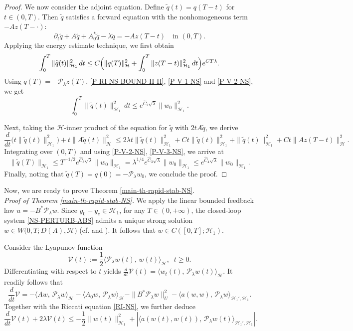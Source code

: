 \documentclass[a4paper]{article}
\numberwithin{equation}{section}
\begin{document}
\begin{proof}
We now consider the adjoint equation. Define $\widetilde q(t)=q(T-t)$ for $t\in(0,T)$. Then $\widetilde q$ satisfies a forward equation with the nonhomogeneous term $-A z(T-\cdot)$:
\[
\partial_t\widetilde q+A\widetilde q+A_0^*\widetilde q-
\lambda\widetilde q=-Az(T-t)\quad \text{in } (0,T).
\]
Applying the energy estimate technique, we first obtain
$$\int_0^T \|\widetilde q(t)\|_{\mathcal H_1}^2\,dt\le C \Bigl(\|q(T)\|_{\mathcal H}^2+ \int_0^T \|  z(T-t)\|_{\mathcal H_1}^2\,dt\Bigr)e^{CT\lambda}.$$
Using $q(T)=-\mathcal{P}_\lambda z(T)$, \eqref{P-RI-NS-BOUND-H-H}, \eqref{P-V-1-NS} and \eqref{P-V-2-NS}, we get 
\begin{equation}\label{P-V-3-NS}
\int_0^T \|\widetilde q(t)\|_{\mathcal H_1}^2\,dt\le e^{\hat C_2\sqrt{\lambda}}\|w_0\|_{\mathcal H_1}^2.
\end{equation}

Next, taking the $\mathcal H$-inner product of the equation for $\widetilde q$ with $2tA\widetilde q$, we derive
$$\frac{d}{dt}\bigl(t\|\widetilde q(t)\|_{\mathcal H_1}^2\bigr)+t\| A\widetilde q(t)\|_{\mathcal H}^2\le2\lambda t\|\widetilde q(t)\|_{\mathcal H_1}^2+Ct\|\widetilde q(t)\|_{\mathcal H_1}^2		+\|\widetilde q(t)\|_{\mathcal H_1}^2+Ct\|  A z(T-t)\|_{\mathcal H}^2.$$
Integrating over $(0,T)$ and using \eqref{P-V-2-NS}, \eqref{P-V-3-NS}, we arrive at
\begin{equation}\label{P-V-4-NS}
\|\widetilde q(T)\|_{\mathcal H_1}\le T^{-1/2}e^{\hat C_3\sqrt{\lambda}}\|w_0\|_{\mathcal H_1}=\lambda^{1/4}e^{\hat C_3\sqrt{\lambda}}\|w_0\|_{\mathcal H_1}\le e^{\hat C_4\sqrt{\lambda}}\|w_0\|_{\mathcal H_1}.
\end{equation}
Finally, noting that $\widetilde q(T)=q(0)=-\mathcal P_\lambda w_0$, we conclude the proof.
\end{proof}

Now, we are ready to prove Theorem \ref{main-th-rapid-stab-NS}.\\[-2mm]

\noindent\textit{Proof of Theorem \ref{main-th-rapid-stab-NS}.}
We apply the linear bounded feedback law $u=-B^*\mathcal P_\lambda w$. Since $y_0-y_e\in \mathcal H_1$, for any $T\in (0,+\infty)$, the closed-loop system \eqref{NS-PERTURB-ABS} admits a unique strong solution $w\in W\big(0,T;D(A),\mathcal{H}\big)$ (cf. \cite[Theorem 1.7]{B2} and \cite[Theorem 3.10, Chapter III]{Teman}). It follows that $w\in C([0,T];\mathcal{H}_1)$.  

Consider the Lyapunov function
$$\mathcal V(t):=\frac12\langle \mathcal P_\lambda w(t),\,w(t)\rangle_{\mathcal H},\;\; t\ge 0.$$
Differentiating with respect to $t$ yields $\frac{d}{dt}\mathcal V(t)=\langle  w_t(t),\,\mathcal P_\lambda w(t)\rangle_{\mathcal H}$. It readily follows that
$$\frac{d}{dt}\mathcal V=-\langle Aw,\,\mathcal P_\lambda w\rangle_{\mathcal H}
-\langle A_0w,\,\mathcal P_\lambda w\rangle_{\mathcal H}-\|B^*\mathcal P_\lambda w\|_U^2-\langle a(w,w),\,\mathcal P_\lambda w\rangle_{\mathcal H_1',\mathcal H_1}.$$
Together with the Riccati equation \eqref{RI-NS}, we further deduce
$$\frac{d}{dt}\mathcal V(t)+2\lambda \mathcal V(t)\le-\frac 12 \|w(t)\|_{\mathcal H_1}^2+|\langle a(w(t),w(t)),\,\mathcal P_\lambda w(t)\rangle_{\mathcal H_1',\mathcal H_1}|.$$
\end{document}
